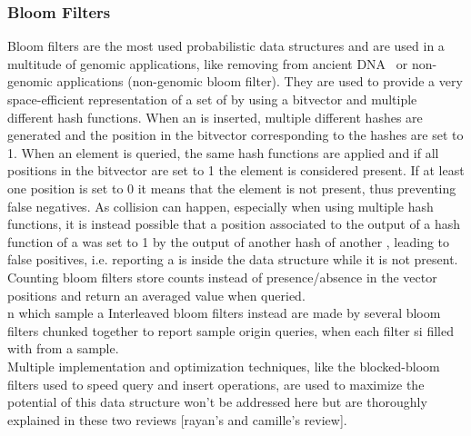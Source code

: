 \subsubsection{Bloom Filters}
Bloom filters are the most used probabilistic data structures and are used in a multitude of genomic applications, like removing from ancient DNA~\cite{akmerbroom} or non-genomic applications (non-genomic bloom filter). They are used to provide a very space-efficient representation of a set of \kmers by using a bitvector and multiple different hash functions. When an \kmer is inserted, multiple different hashes are generated and the position in the bitvector corresponding to the hashes are set to 1. When an element is queried, the same hash functions are applied and if all positions in the bitvector are set to 1 the element is considered present. If at least one position is set to 0 it means that the element is not present, thus preventing false negatives. As collision can happen, especially when using multiple hash functions, it is instead possible that a position associated to the output of a hash function of a \kmer was set to 1 by the output of another hash of another \kmer, leading to false positives, i.e. reporting a \kmer is inside the data structure while it is not present.\\
Counting bloom filters store counts instead of presence/absence in the vector positions and return an averaged value when queried.\\n which sample a 
Interleaved bloom filters instead are made by several bloom filters chunked together to report sample origin queries, when each filter si filled with \kmers from a sample.\\
Multiple implementation and optimization techniques, like the blocked-bloom filters used to speed query and insert operations, are used to maximize the potential of this data structure won't be addressed here but are thoroughly explained in these two reviews [rayan's and camille's review]. 


